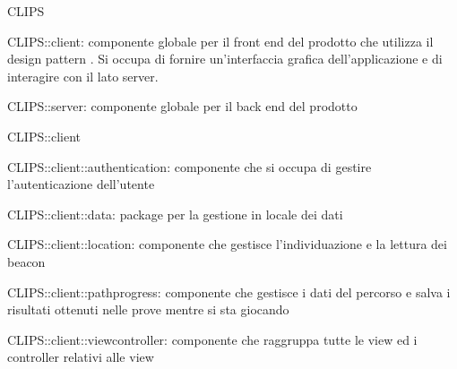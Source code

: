 \begin{componente}{CLIPS}
\begin{compPackageContenuti}
\item CLIPS::client: componente globale per il front end del prodotto che utilizza il design pattern . Si occupa di fornire un'interfaccia grafica dell'applicazione e di interagire con il lato server.
\item CLIPS::server: componente globale per il back end del prodotto
\end{compPackageContenuti}
\end{componente}
\begin{componente}{CLIPS::client}
\begin{compPackageContenuti}
\item CLIPS::client::authentication: componente che si occupa di gestire l'autenticazione dell'utente
\item CLIPS::client::data: package per la gestione in locale dei dati
\item CLIPS::client::location: componente che gestisce l'individuazione e la lettura dei beacon
\item CLIPS::client::pathprogress: componente che gestisce i dati del percorso e salva i risultati ottenuti nelle prove mentre si sta giocando
\item CLIPS::client::viewcontroller: componente che raggruppa tutte le view ed i controller relativi alle view
\end{compPackageContenuti}
\end{componente}
